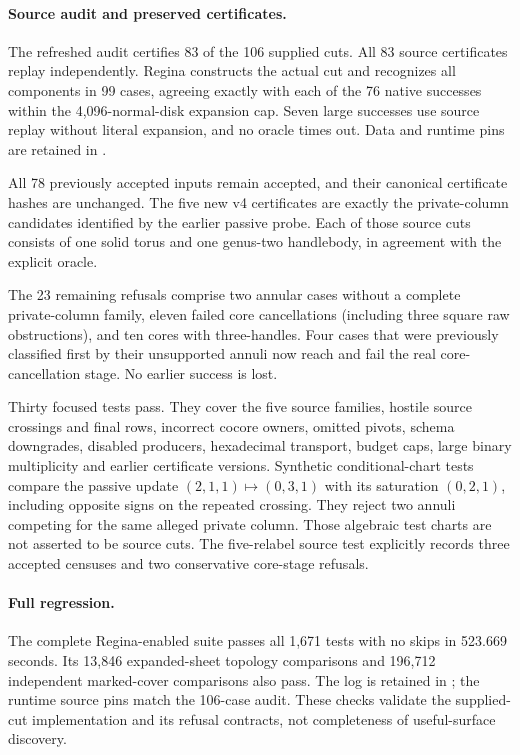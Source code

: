 \paragraph{Source audit and preserved certificates.}
The refreshed audit certifies 83 of the 106 supplied cuts. All 83 source
certificates replay independently. Regina constructs the actual cut and
recognizes all components in 99 cases, agreeing exactly with each of the
76 native successes within the 4,096-normal-disk expansion cap. Seven large
successes use source replay without literal expansion, and no oracle times out.
Data and runtime pins are retained in .

All 78 previously accepted inputs remain accepted, and their canonical
certificate hashes are unchanged. The five new v4 certificates are exactly
the private-column candidates identified by the earlier passive probe.
Each of those source cuts consists of one solid torus and one genus-two
handlebody, in agreement with the explicit oracle.

The 23 remaining refusals comprise two annular cases without a complete
private-column family, eleven failed core cancellations (including three
square raw obstructions), and ten cores with three-handles. Four cases that
were previously classified first by their unsupported annuli now reach and
fail the real core-cancellation stage. No earlier success is lost.

Thirty focused tests pass. They cover the five source families, hostile
source crossings and final rows, incorrect cocore owners, omitted pivots,
schema downgrades, disabled producers, hexadecimal transport, budget caps,
large binary multiplicity and earlier certificate versions. Synthetic
conditional-chart tests compare the passive update $(2,1,1)\mapsto(0,3,1)$
with its saturation $(0,2,1)$, including opposite signs on the repeated
crossing. They reject two annuli competing for the same alleged private
column. Those algebraic test charts are not asserted to be source cuts.
The five-relabel source test explicitly records three accepted censuses and
two conservative core-stage refusals.

\paragraph{Full regression.}
The complete Regina-enabled suite passes all 1,671 tests with no skips in
523.669 seconds. Its 13,846 expanded-sheet topology comparisons and 196,712
independent marked-cover comparisons also pass. The log is retained in
; the runtime source pins match the 106-case
audit. These checks validate the supplied-cut implementation and its refusal
contracts, not completeness of useful-surface discovery.

